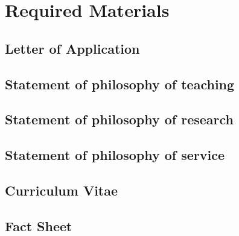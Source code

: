 \documentclass[ openright,titlepage,numbers=noenddot,headinclude,%
                footinclude=true,cleardoublepage=empty,abstractoff, 
                BCOR=5mm,paper=letter,fontsize=11pt,%
                ngerman, american, %
                ]{scrreprt}
\begin{document}
\frenchspacing
\raggedbottom
{} %
\pagestyle{plain}

\pagestyle{scrheadings}
\cleardoublepage
\cleardoublepage
\part{Required Materials}
%

\chapter{Letter of Application}
%

\chapter{Statement of philosophy of teaching}
%
\chapter{Statement of philosophy of research}
%
\chapter{Statement of philosophy of service}
%

\chapter{Curriculum Vitae}


\chapter{Fact Sheet}
%
\end{document}
